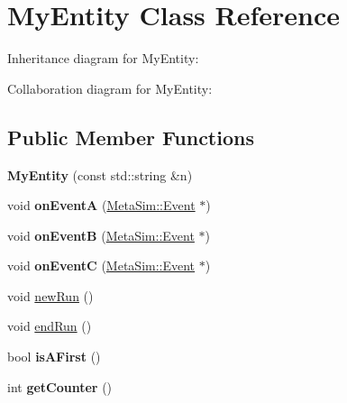 \hypertarget{classMyEntity}{}\section{My\+Entity Class Reference}
\label{classMyEntity}


Inheritance diagram for My\+Entity\+:


Collaboration diagram for My\+Entity\+:
\subsection*{Public Member Functions}
\begin{DoxyCompactItemize}
\item 
{\bfseries My\+Entity} (const std\+::string \&n)\hypertarget{classMyEntity_aac47d7e1d772dd2a17407853eaa344d9}{}\label{classMyEntity_aac47d7e1d772dd2a17407853eaa344d9}

\item 
void {\bfseries on\+EventA} (\hyperlink{classMetaSim_1_1Event}{Meta\+Sim\+::\+Event} $\ast$)\hypertarget{classMyEntity_aab21e1f7b8c0b17cf454c79d200e30bd}{}\label{classMyEntity_aab21e1f7b8c0b17cf454c79d200e30bd}

\item 
void {\bfseries on\+EventB} (\hyperlink{classMetaSim_1_1Event}{Meta\+Sim\+::\+Event} $\ast$)\hypertarget{classMyEntity_a4b41503ad1f8f424bc9a1231fb9bc9f3}{}\label{classMyEntity_a4b41503ad1f8f424bc9a1231fb9bc9f3}

\item 
void {\bfseries on\+EventC} (\hyperlink{classMetaSim_1_1Event}{Meta\+Sim\+::\+Event} $\ast$)\hypertarget{classMyEntity_a2f288e799e24ab46179ce18041854fed}{}\label{classMyEntity_a2f288e799e24ab46179ce18041854fed}

\item 
void \hyperlink{classMyEntity_a3a19fa3aefcdd55caabe2ea5116d5c3b}{new\+Run} ()
\item 
void \hyperlink{classMyEntity_a1d8ff25d7e681bb38f7826ea1ddf6aaf}{end\+Run} ()
\item 
bool {\bfseries is\+A\+First} ()\hypertarget{classMyEntity_a25c5a91376d06e0ffbf905a375e41e5a}{}\label{classMyEntity_a25c5a91376d06e0ffbf905a375e41e5a}

\item 
int {\bfseries get\+Counter} ()\hypertarget{classMyEntity_a0b083a4fbac759a17f79cb54540acac9}{}\label{classMyEntity_a0b083a4fbac759a17f79cb54540acac9}

\end{DoxyCompactItemize}
